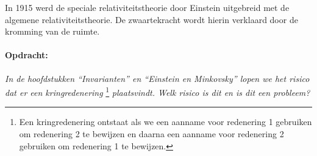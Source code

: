 In 1915 werd de speciale relativiteitstheorie door Einstein uitgebreid
met de algemene relativiteitstheorie. De zwaartekracht wordt hierin
verklaard door de kromming van de ruimte.


\paragraph*{Opdracht:}

\emph{In de hoofdstukken ``Invarianten'' en ``Einstein en Minkovsky''
lopen we het risico dat er een kringredene\-ring} \footnote{Een
kringredenering ontstaat als we een aanname voor redenering 1 gebruiken
om redenering 2 te bewijzen en daarna een aanname voor redenering 2
gebruiken om redenering 1 te bewijzen. }\emph{ plaatsvindt. Welk risico
is dit en is dit een probleem? }


